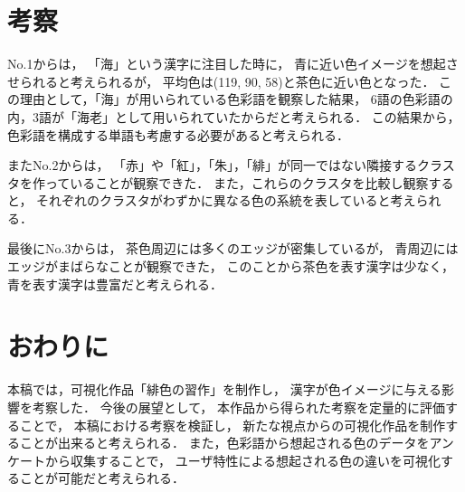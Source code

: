 \documentclass[a4j,twocolumn]{ujarticle} %
\newcommand{\workname}{緋色の習作}
\newcommand{\colorname}{色彩語}
\newcommand{\recallcolor}{色イメージ}
\newcommand{\mysection}[1]{\vspace{-20pt}\section{#1}}
\begin{document}
\mysection{考察}
\label{consideration}

No.1からは，
「海」という漢字に注目した時に，
青に近い\recallcolor{}を想起させられると考えられるが，
平均色は(119, 90, 58)と茶色に近い色となった．
この理由として，「海」が用いられている\colorname{}を観察した結果，
6語の\colorname{}の内，3語が「海老」として用いられていたからだと考えられる．
この結果から，\colorname{}を構成する単語も考慮する必要があると考えられる．

またNo.2からは，
「赤」や「紅」，「朱」，「緋」が同一ではない隣接するクラスタを作っていることが観察できた．
また，これらのクラスタを比較し観察すると，
それぞれのクラスタがわずかに異なる色の系統を表していると考えられる．

最後にNo.3からは，
茶色周辺には多くのエッジが密集しているが，
青周辺にはエッジがまばらなことが観察できた，
このことから茶色を表す漢字は少なく，青を表す漢字は豊富だと考えられる．

\mysection{おわりに}

本稿では，可視化作品「\workname{}」を制作し，
漢字が\recallcolor{}に与える影響を考察した．
今後の展望として，
本作品から得られた考察を定量的に評価することで，
本稿における考察を検証し，
新たな視点からの可視化作品を制作することが出来ると考えられる．
また，\colorname{}から想起される色のデータをアンケートから収集することで，
ユーザ特性による想起される色の違いを可視化することが可能だと考えられる．

\vspace{-2zh}




\end{document}
